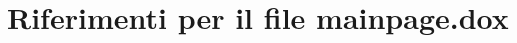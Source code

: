\hypertarget{mainpage_8dox}{}\section{Riferimenti per il file mainpage.\+dox}
\label{mainpage_8dox}
